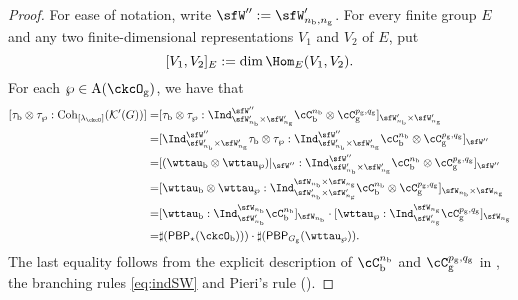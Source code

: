 \documentclass[12pt,a4paper]{amsart}
\newcommand{\CK}{{\mathcal {K}}}
\numberwithin{equation}{section}
\theoremstyle{remark}
\def\nbb{n_{\mathrm b}}
\def\Coh{\mathrm{Coh}}
\def\PBP{\mathsf{PBP}}
\def\ckcOb{\ckcO_{\mathrm b}}
\def\ckcOg{\ckcO_{\mathrm g}}
\def\Gg{G_{\mathrm g}}
\begin{document}
\begin{proof}
  For ease of notation, write $\sfW'':=\sfW_{n_{\mathrm b},n_{\mathrm g}}'$. For every finite group $E$ and any  two finite-dimensional  representations $V_1$ and $V_2$ of $E$, put
  \[
    [V_1, V_2]_E:=\dim \Hom_E(V_1, V_2).
  \]  
   For each $\wp\in \mathrm A (\ckcOg)$, we have that
  \[
    \begin{split}
    [\tau_{\mathrm b}\otimes \tau_{\wp}: \Coh_{[\lambda_{\ckcO}]} (\CK'(G))]
      = & [\tau_{\mathrm b}\otimes \tau_{\wp} :
      \Ind_{\sfW'_{n_{\mathrm b}}\times \sfW'_{n_{\mathrm g}}}^{\sfW''} \cC_{\mathrm b}^{\nbb} \otimes \cC_{\mathrm g}^{p_{\mathrm g},q_{\mathrm g}}]_{\sfW'_{n_{\mathrm b}}\times \sfW'_{n_{\mathrm g}}}\\
      = & [\Ind_{\sfW'_{n_{\mathrm b}}\times \sfW'_{n_{\mathrm g}}}^{\sfW''} \tau_{\mathrm b}\otimes \tau_{\wp} :
      \Ind_{\sfW'_{n_{\mathrm b}}\times \sfW'_{n_{\mathrm g}}}^{\sfW''} \cC_{\mathrm b}^{\nbb} \otimes \cC_{\mathrm g}^{p_{\mathrm g},q_{\mathrm g}}]_{\sfW''}\\
      = & [(\wttau_{\mathrm b}\otimes \wttau_{\wp})|_{\sfW''}:
      \Ind_{\sfW'_{n_{\mathrm b}}\times \sfW'_{n_{\mathrm g}}}^{\sfW''} \cC_{\mathrm b}^{\nbb} \otimes \cC_{\mathrm g}^{p_{\mathrm g},q_{\mathrm g}}]_{\sfW''}\\
      = & [\wttau_{\mathrm b}\otimes \wttau_{\wp}:
      \Ind_{\sfW'_{n_{\mathrm b}}\times \sfW'_{n_{\mathrm g}}}^{\sfW_{n_{\mathrm b}}\times \sfW_{n_{\mathrm g}}} \cC_{\mathrm b}^{\nbb} \otimes \cC_{\mathrm g}^{p_{\mathrm g},q_{\mathrm g}}]_{\sfW_{n_{\mathrm b}}\times \sfW_{n_{\mathrm g}}}\\
       = & [\wttau_{\mathrm b}:\Ind_{\sfW'_{n_{\mathrm b}}}^{\sfW_{n_{\mathrm b}}} \cC_{\mathrm b}^{\nbb}]_{\sfW_{n_{\mathrm b}}}\cdot
           [\wttau_{\wp}:\Ind_{\sfW'_{n_{\mathrm g}}}^{\sfW_{n_{\mathrm g}}} \cC_{\mathrm g}^{p_{\mathrm g},q_{\mathrm g}}]_{\sfW_{n_{\mathrm g}}}\\
      =& \sharp(\PBP_{\star}(\ckcOb)))\cdot \sharp(\PBP_{\Gg}(\wttau_{\wp})).
    \end{split}
  \]
  The last equality follows from the explicit description of
  $\cC_{\mathrm b}^{\nbb}$ and $\cC_{\mathrm g}^{p_{\mathrm g},q_{\mathrm g}}$
  in , the branching rules
  \eqref{eq:indSW} and
  Pieri's rule (\cite[Corollary 9.2.4]{GW}).
\end{proof}
\end{document}
